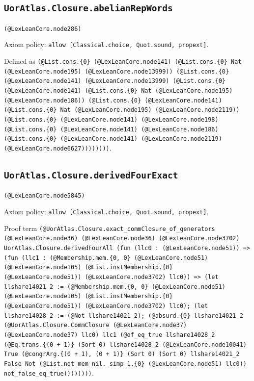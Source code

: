 \documentclass[11pt]{article}
\begin{document}
\subsection*{\texttt{UorAtlas.Closure.abelianRepWords}}
\noindent\texttt{(@LexLeanCore.node286)}\par
\noindent Axiom policy: \texttt{allow [Classical.choice, Quot.sound, propext]}.\par
\noindent Defined as \texttt{(@List.cons.\{0\} (@LexLeanCore.node141) (@List.cons.\{0\} Nat (@LexLeanCore.node195) (@LexLeanCore.node13999)) (@List.cons.\{0\} (@LexLeanCore.node141) (@LexLeanCore.node13999) (@List.cons.\{0\} (@LexLeanCore.node141) (@List.cons.\{0\} Nat (@LexLeanCore.node195) (@LexLeanCore.node186)) (@List.cons.\{0\} (@LexLeanCore.node141) (@List.cons.\{0\} Nat (@LexLeanCore.node195) (@LexLeanCore.node2119)) (@List.cons.\{0\} (@LexLeanCore.node141) (@LexLeanCore.node198) (@List.cons.\{0\} (@LexLeanCore.node141) (@LexLeanCore.node186) (@List.cons.\{0\} (@LexLeanCore.node141) (@LexLeanCore.node2119) (@LexLeanCore.node6627))))))))}.\par
\subsection*{\texttt{UorAtlas.Closure.derivedFourExact}}
\noindent\texttt{(@LexLeanCore.node5845)}\par
\noindent Axiom policy: \texttt{allow [Classical.choice, Quot.sound, propext]}.\par
\noindent Proof term \texttt{(@UorAtlas.Closure.exact\_commClosure\_of\_generators (@LexLeanCore.node36) (@LexLeanCore.node36) (@LexLeanCore.node3702) UorAtlas.Closure.derivedFourAll (fun (llc0 : (@LexLeanCore.node51)) => (fun (llc1 : (@Membership.mem.\{0, 0\} (@LexLeanCore.node51) (@LexLeanCore.node105) (@List.instMembership.\{0\} (@LexLeanCore.node51)) (@LexLeanCore.node3702) llc0)) => (let llshare14021\_2 := (@Membership.mem.\{0, 0\} (@LexLeanCore.node51) (@LexLeanCore.node105) (@List.instMembership.\{0\} (@LexLeanCore.node51)) (@LexLeanCore.node3702) llc0); (let llshare14028\_2 := (@Not llshare14021\_2); (@absurd.\{0\} llshare14021\_2 (@UorAtlas.Closure.CommClosure (@LexLeanCore.node37) (@LexLeanCore.node37) llc0) llc1 (@of\_eq\_true llshare14028\_2 (@Eq.trans.\{(0 + 1)\} (Sort 0) llshare14028\_2 (@LexLeanCore.node10041) True (@congrArg.\{(0 + 1), (0 + 1)\} (Sort 0) (Sort 0) llshare14021\_2 False Not (@List.not\_mem\_nil.\_simp\_1.\{0\} (@LexLeanCore.node51) llc0)) not\_false\_eq\_true))))))))}.\par
\end{document}
